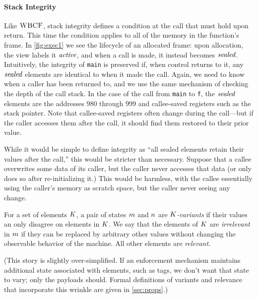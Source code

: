 \documentclass[10pt,conference]{ieeetran}%
\theoremstyle{definition}
\begin{document}

\paragraph*{Stack Integrity}

Like \(\textnormal{\sc WBCF}\), stack integrity defines a condition at the call that must hold upon
return. This time the condition applies to all of the memory in the function's
frame. In \cref{fig:exec1} we see the lifecycle of an allocated frame:
upon allocation, the view labels it \(\mathit{active}\), and when a call is made, it instead
becomes \(\mathit{sealed}\). Intuitively, the integrity of {\tt main}
is preserved if, when control returns to it, any \(\mathit{sealed}\) elements
are identical to when it made the call.
%
Again, we need to know when a caller has been returned to,
and we use the same mechanism of checking the depth of the call stack.
%
In the case of the call from {\tt main} to {\tt f}, the \(\mathit{sealed}\) elements are the
addresses 980 through 999 and callee-saved registers such as
the stack pointer. Note that callee-saved registers often change
during the call---but if the caller accesses them after the call, it should find them
restored to their prior value.

While it would be simple to define integrity as ``all sealed elements retain their
values after the call,'' this would be stricter than necessary. Suppose that
a callee overwrites some data of its caller, but the caller never accesses that data
(or only does so after re-initializing it.) This would be harmless, with the callee
essentially using the caller's memory as scratch space, but the caller never seeing any change.

For a set of elements \(K\),
a pair of states \(m\) and \(n\) are {\em \(K\)-variants} if
their values an only disagree on elements in \(K\).
We say that the elements of \(K\) are \emph{irrelevant}
in \(m\) if they can be replaced by arbitrary other values without changing the
observable behavior of the machine. All other elements are \emph{relevant}.

(This story is slightly over-simplified. If an enforcement mechanism maintains
additional state associated with elements, such as tags, we don't want that
state to vary; only the payloads should. Formal definitions of variants and
relevance that incorporate this wrinkle are given in \cref{sec:props}.)
\end{document}
